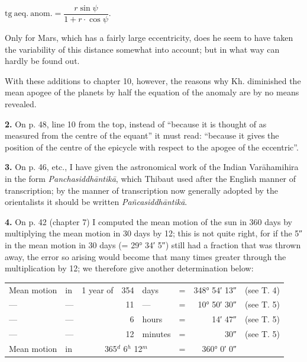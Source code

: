 \documentclass[11pt]{article}
\begin{document}
\par\begin{center}$\mathrm{tg\ aeq.\ anom.} = \dfrac{r\sin\psi}{1+r\cdot\cos\psi}$.\end{center}
\par Only for Mars, which has a fairly large eccentricity, does he seem to have taken the variability of this distance somewhat into account; but in what way can hardly be found out.\par
\par With these additions to chapter 10, however, the reasons why Kh. diminished the mean apogee of the planets by half the equation of the anomaly are by no means revealed.\par
\par \textbf{2.} On p. 48, line 10 from the top, instead of “because it is thought of as measured from the centre of the equant” it must read: “because it gives the position of the centre of the epicycle with respect to the apogee of the eccentric”.\par
\par \textbf{3.} On p. 46, etc., I have given the astronomical work of the Indian Varāhamihira in the form \emph{Panchasiddhāntikā}, which Thibaut used after the English manner of transcription; by the manner of transcription now generally adopted by the orientalists it should be written \emph{Pañcasiddhāntikā}.\par
\par \textbf{4.} On p. 42 (chapter 7) I computed the mean motion of the sun in 360 days by multiplying the mean motion in 30 days by 12; this is not quite right, for if the 5″ in the mean motion in 30 days (= 29° 34′ 5″) still had a fraction that was thrown away, the error so arising would become that many times greater through the multiplication by 12; we therefore give another determination below:\par
\begin{center}\small\begin{tabular}{lllrlcrl}
Mean motion & in & 1 year of & 354 & days & = & 348° 54′ 13″ & (see T. 4) \\
— & — &  & 11 & — & = & 10° 50′ 30″ & (see T. 5) \\
— & — &  & 6 & hours & = & 14′ 47″ & (see T. 5) \\
— & — &  & 12 & minutes & = & 30″ & (see T. 5) \\
\midrule
Mean motion & in & \multicolumn{3}{c}{365$^{d}$ 6$^{h}$ 12$^{m}$} & = & 360° 0′ 0″ &  \\
\end{tabular}\end{center}
\end{document}
